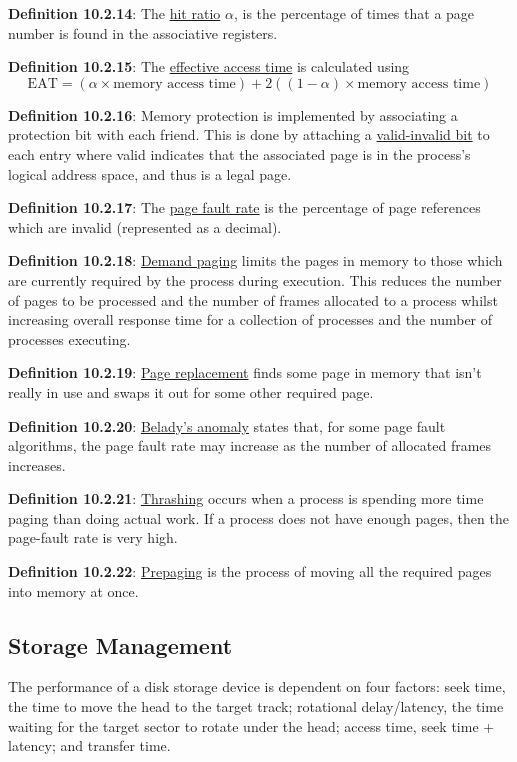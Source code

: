 \documentclass{article}
\newcommand{\separate}[1] {\vspace{#1 pt}\noindent}
\newcommand{\definition}[2]{\textbf{Definition #1}: #2\label{def:#1}}
\begin{document}
\separate{7}\definition{10.2.14}{The \underline{hit ratio} \(\alpha\), is the percentage of times that a page number is found in the associative registers.}

\separate{7}\definition{10.2.15}{The \underline{effective access time} is calculated using
\begin{equation}
    \text{EAT} = (\alpha \times \text{memory access time}) + 2((1 - \alpha) \times \text{memory access time})
\end{equation}}

\separate{7}\definition{10.2.16}{Memory protection is implemented by associating a protection bit with each friend. This is done by attaching a \underline{valid-invalid bit} to each entry where valid indicates that the associated page is in the process's logical address space, and thus is a legal page.}

\separate{7}\definition{10.2.17}{The \underline{page fault rate} is the percentage of page references which are invalid (represented as a decimal).}

\separate{7}\definition{10.2.18}{\underline{Demand paging} limits the pages in memory to those which are currently required by the process during execution. This reduces the number of pages to be processed and the number of frames allocated to a process whilst increasing overall response time for a collection of processes and the number of processes executing.}

\separate{7}\definition{10.2.19}{\underline{Page replacement} finds some page in memory that isn't really in use and swaps it out for some other required page.}

\separate{7}\definition{10.2.20}{\underline{Belady's anomaly} states that, for some page fault algorithms, the page fault rate may increase as the number of allocated frames increases.}

\separate{7}\definition{10.2.21}{\underline{Thrashing} occurs when a process is spending more time paging than doing actual work. If a process does not have enough pages, then the page-fault rate is very high.}

\separate{7}\definition{10.2.22}{\underline{Prepaging} is the process of moving all the required pages into memory at once.}

\subsection{Storage Management}

The performance of a disk storage device is dependent on four factors: seek time, the time to move the head to the target track; rotational delay/latency, the time waiting for the target sector to rotate under the head; access time, seek time + latency; and transfer time.
\end{document}
